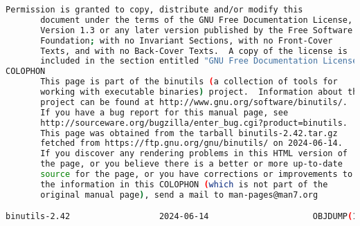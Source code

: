 {{\begin{lstlisting}[language=bash]
       Permission is granted to copy, distribute and/or modify this
       document under the terms of the GNU Free Documentation License,
       Version 1.3 or any later version published by the Free Software
       Foundation; with no Invariant Sections, with no Front-Cover
       Texts, and with no Back-Cover Texts.  A copy of the license is
       included in the section entitled "GNU Free Documentation License".
COLOPHON
       This page is part of the binutils (a collection of tools for
       working with executable binaries) project.  Information about the
       project can be found at http://www.gnu.org/software/binutils/.
       If you have a bug report for this manual page, see
       http://sourceware.org/bugzilla/enter_bug.cgi?product=binutils.
       This page was obtained from the tarball binutils-2.42.tar.gz
       fetched from https://ftp.gnu.org/gnu/binutils/ on 2024-06-14.
       If you discover any rendering problems in this HTML version of
       the page, or you believe there is a better or more up-to-date
       source for the page, or you have corrections or improvements to
       the information in this COLOPHON (which is not part of the
       original manual page), send a mail to man-pages@man7.org

binutils-2.42                  2024-06-14                     OBJDUMP(1)
\end{lstlisting}
}}
\endinput  %
